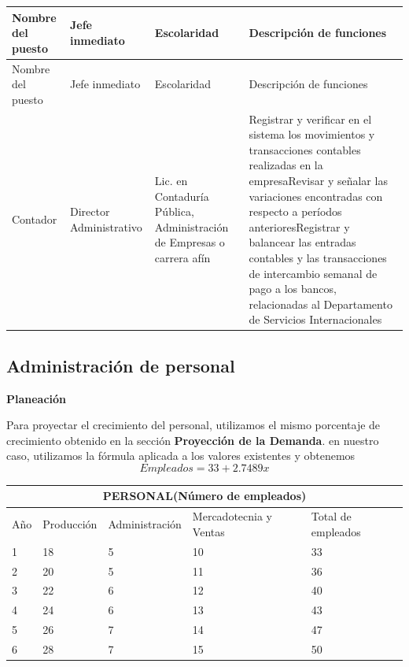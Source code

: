 \begin{longtable}[p]{ |p{2cm}||p{2cm}|p{4.5cm}|p{4.5cm}| }

 \hline
 Nombre del puesto & Jefe inmediato & Escolaridad & Descripción de funciones\\
 \hline
 \endfirsthead

 \hline
 Nombre del puesto & Jefe inmediato & Escolaridad & Descripción de funciones\\
 \hline
 \endhead
 
 \hline

 Contador & Director Administrativo &  Lic. en Contaduría Pública, Administración de Empresas o carrera afín & Registrar y verificar en el sistema los movimientos y transacciones contables realizadas en la empresa\newline Revisar y señalar las variaciones encontradas con respecto a períodos anteriores\newline Registrar y balancear las entradas contables y las transacciones de intercambio semanal de pago a los bancos, relacionadas al Departamento de Servicios Internacionales\\
 \hline

\end{longtable}
\newpage

\subsection{Administración de personal}

\textbf{Planeación}

Para proyectar el crecimiento del personal, utilizamos el mismo porcentaje de crecimiento obtenido en la sección \textbf{Proyección de la Demanda}. en nuestro caso, utilizamos la fórmula aplicada a los valores existentes y obtenemos \[ Empleados = 33 + 2.7489x\]

\begin{tabular}{ |p{1cm}|p{2cm}|p{3cm}|p{3cm}|p{3cm}|  }
 \hline
 \multicolumn{5}{|c|}{PERSONAL\newline (Número de empleados)} \\
 \hline
 Año & Producción & Administración & Mercadotecnia y Ventas & Total de empleados\\
 \hline
 1 & 18 & 5 & 10 & 33\\
 \hline
 2 & 20 & 5 & 11 & 36\\
 \hline
 3 & 22 & 6 & 12 & 40\\
 \hline
 4 & 24 & 6 & 13 & 43\\
 \hline
 5 & 26 & 7 & 14 & 47\\
 \hline
 6 & 28 & 7 & 15 & 50\\
 \hline
\end{tabular}

